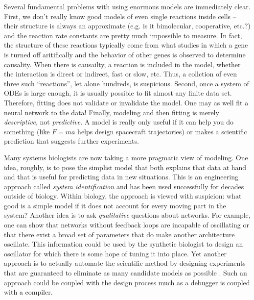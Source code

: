 Several fundamental problems with using enormous models are
immediately clear. First, we don't really know good models of even
single reactions inside cells -- their structure is always an
approximate (e.g. is it bimolecular, cooperative, etc.?) and the
reaction rate constants are pretty much impossible to measure. In
fact, the structure of these reactions typically come from what
studies in which a gene is turned off aritifically and the behavior of
other genes is observed to determine causality. When there is
causailty, a reaction is included in the model, whether the
interaction is direct or indirect, fast or slow, etc. Thus, a
collction of even three such ``reactions'', let alone hundreds, is
suspicious. Second, once a system of ODEs is large enough, it is
usually possible to fit almost any finite data set. Therefore, fitting
does not validate or invalidate the model. One may as well fit a
neural network to the data! Finally, modeling and then fitting is
merely {\em descriptive}, not {\em predictive}. A model is really only
useful if it can help you do something (like $F=ma$ helps design
spacecraft trajectories) or makes a scientific prediction that
suggests further experiments.

Many systems biologists are now taking a more pragmatic view of
modeling. One idea, roughly, is to pose the simplist model that both
explains that data at hand and that is useful for predicting data in
new situations\cite{avano}. This is an engineering approach called
{\em system identification} and has been used successfully for decades
outside of biology. Within biology, the approach is viewed with
suspicion: what good is a simple model if it does not account for
every moving part in the system? Another idea is to ask {\em
  qualitative} questions about
networks\cite{zero-deficiency,monotonic-networks}. For example, one
can show that networks without feedback loops are incapable of
oscillating or that there exist a broad set of parameters that do make
another architecture oscillate. This information could be used by the
synthetic biologist to design an oscillator for which there is some
hope of tuning it into place. Yet another approach is to actually
automate the scientific method by designing experiments that are
guaranteed to eliminate as many candidate models as possible
\cite{georgiev-klavins-descrimination}. Such an approach could be
coupled with the design process much as a debugger is coupled with a
compiler.

